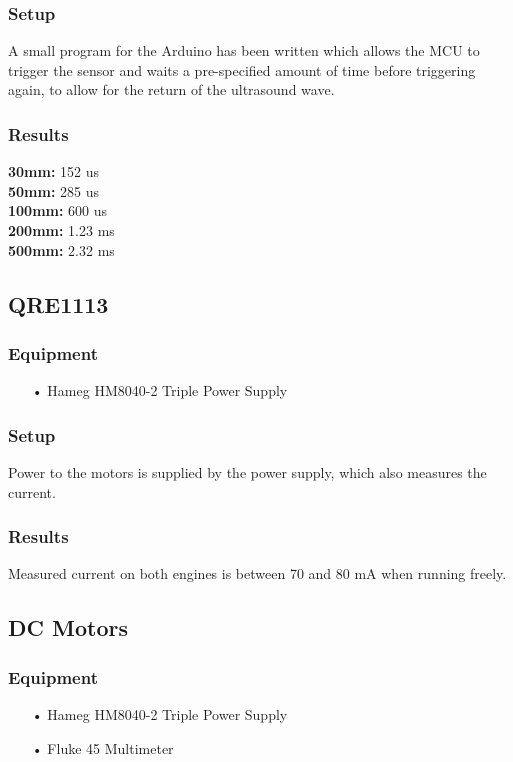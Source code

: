 \subsubsection{Setup}
A small program for the Arduino has been written which allows the MCU to trigger the sensor and waits a pre-specified amount of time before triggering again, to allow for the return of the ultrasound wave. 

\subsubsection{Results}
\textbf{30mm:}  152 us\\
\textbf{50mm:}  285 us\\
\textbf{100mm:} 600 us\\
\textbf{200mm:} 1.23 ms\\
\textbf{500mm:} 2.32 ms\\

\subsection{QRE1113}

\subsubsection{Equipment}
\begin{enumerate}
    \item[•]Hameg HM8040-2 Triple Power Supply
\end{enumerate}

\subsubsection{Setup}
Power to the motors is supplied by the power supply, which also measures the current.

\subsubsection{Results}
Measured current on both engines is between 70 and 80 mA when running freely.

\subsection{DC Motors}

\subsubsection{Equipment}
\begin{enumerate}
	\item[•]Hameg HM8040-2 Triple Power Supply
	\item[•]Fluke 45 Multimeter
\end{enumerate}

